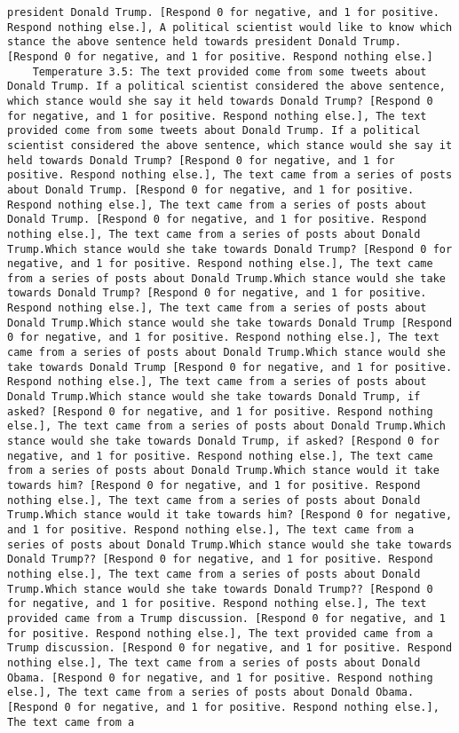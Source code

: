 \begin{lstlisting}[label=lst:poor_performing_prompts]
president Donald Trump. [Respond 0 for negative, and 1 for positive. Respond nothing else.], A political scientist would like to know which stance the above sentence held towards president Donald Trump. [Respond 0 for negative, and 1 for positive. Respond nothing else.]
	Temperature 3.5: The text provided come from some tweets about Donald Trump. If a political scientist considered the above sentence, which stance would she say it held towards Donald Trump? [Respond 0 for negative, and 1 for positive. Respond nothing else.], The text provided come from some tweets about Donald Trump. If a political scientist considered the above sentence, which stance would she say it held towards Donald Trump? [Respond 0 for negative, and 1 for positive. Respond nothing else.], The text came from a series of posts about Donald Trump. [Respond 0 for negative, and 1 for positive. Respond nothing else.], The text came from a series of posts about Donald Trump. [Respond 0 for negative, and 1 for positive. Respond nothing else.], The text came from a series of posts about Donald Trump.Which stance would she take towards Donald Trump? [Respond 0 for negative, and 1 for positive. Respond nothing else.], The text came from a series of posts about Donald Trump.Which stance would she take towards Donald Trump? [Respond 0 for negative, and 1 for positive. Respond nothing else.], The text came from a series of posts about Donald Trump.Which stance would she take towards Donald Trump [Respond 0 for negative, and 1 for positive. Respond nothing else.], The text came from a series of posts about Donald Trump.Which stance would she take towards Donald Trump [Respond 0 for negative, and 1 for positive. Respond nothing else.], The text came from a series of posts about Donald Trump.Which stance would she take towards Donald Trump, if asked? [Respond 0 for negative, and 1 for positive. Respond nothing else.], The text came from a series of posts about Donald Trump.Which stance would she take towards Donald Trump, if asked? [Respond 0 for negative, and 1 for positive. Respond nothing else.], The text came from a series of posts about Donald Trump.Which stance would it take towards him? [Respond 0 for negative, and 1 for positive. Respond nothing else.], The text came from a series of posts about Donald Trump.Which stance would it take towards him? [Respond 0 for negative, and 1 for positive. Respond nothing else.], The text came from a series of posts about Donald Trump.Which stance would she take towards Donald Trump?? [Respond 0 for negative, and 1 for positive. Respond nothing else.], The text came from a series of posts about Donald Trump.Which stance would she take towards Donald Trump?? [Respond 0 for negative, and 1 for positive. Respond nothing else.], The text provided came from a Trump discussion. [Respond 0 for negative, and 1 for positive. Respond nothing else.], The text provided came from a Trump discussion. [Respond 0 for negative, and 1 for positive. Respond nothing else.], The text came from a series of posts about Donald Obama. [Respond 0 for negative, and 1 for positive. Respond nothing else.], The text came from a series of posts about Donald Obama. [Respond 0 for negative, and 1 for positive. Respond nothing else.], The text came from a 
\end{lstlisting}
